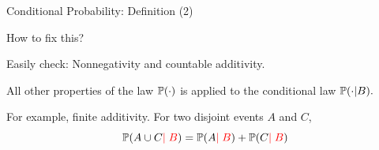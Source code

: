 \documentclass[handout,fleqn,aspectratio=169]{beamer}
\begin{document}
\begin{frame}{Conditional Probability: Definition (2)}

\plitemsep 0.1in
\bci 

\item<1-> How to fix this?  

\item<4-> Easily check: Nonnegativity and countable additivity.  

\item<5-> All other properties of the law $\mathbb{P}( \cdot )$ is applied to the conditional law $\mathbb{P}( \cdot | B ).$ 

\item<6-> For example, finite additivity. For two disjoint events $A$ and $C$, 
$$
\mathbb{P}( A \cup C {\color{red} \mid B} ) = \mathbb{P}( A {\color{red} \mid B} ) + \mathbb{P}( C {\color{red} \mid B} )
$$
\eci 

\end{frame}
\end{document}
